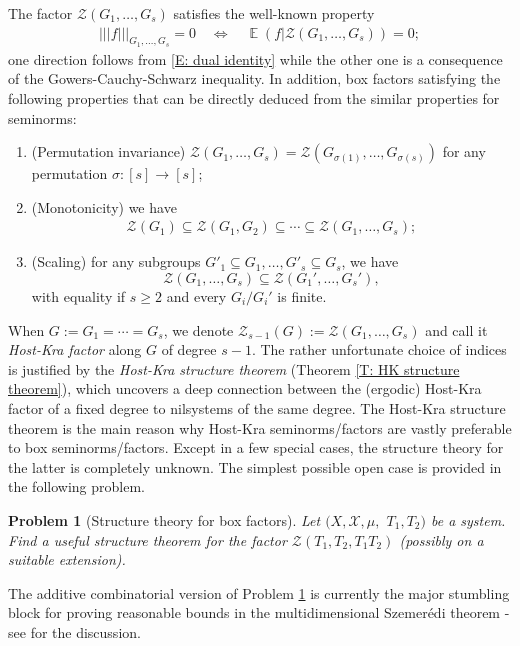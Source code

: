 \documentclass[11pt]{amsart}
\newtheorem{problem}{Problem}
\theoremstyle{definition}
\DeclareMathOperator*{\E}{\mathbb{E}}
\newcommand{\CX}{{\mathcal X}}
\newcommand{\CZ}{{\mathcal Z}}
\newcommand{\bh}{{\mathbf{h}}}
\newcommand{\nnorm}[1]{\lvert\!|\!| #1|\!|\!\rvert}
\newcommand{\1}{{\mathbf{1}}}
\begin{document}
The factor $\CZ({G_1, \ldots, G_s})$ satisfies the well-known property
\begin{align}\label{E: factor property}
    \nnorm{f}_{G_1, \ldots, G_s} = 0 \quad \Longleftrightarrow\quad \E(f|\CZ(G_1, \ldots, G_s)) = 0;
\end{align}
one direction follows from \eqref{E: dual identity} while the other one is a consequence of the Gowers-Cauchy-Schwarz inequality. In addition, box factors satisfying the following properties that can be directly deduced from the similar properties for seminorms:
\begin{enumerate}
    \item (Permutation invariance) $\CZ(G_1, \ldots, G_s) = \CZ(G_{\sigma(1)},\ldots, G_{\sigma(s)})$ for
    any permutation $\sigma:[s]\to[s]$; 
    \item (Monotonicity) we have
    \begin{align}\label{E: monotonicity of factors}
    \CZ(G_1)\subseteq \CZ({G_1, G_2})\subseteq \cdots\subseteq    \CZ({G_1, \ldots, G_s});
    \end{align}
    \item  (Scaling) for any subgroups $G'_1\subseteq G_1, \ldots, G'_s\subseteq G_s$, we have $$\CZ(G_1, \ldots, G_s)\subseteq \CZ(G_1', \ldots, G_s'),$$ with equality if $s\geq 2$ and every $G_i/G_i'$ is finite.
\end{enumerate}

When $G:=G_1 = \cdots = G_s$, we denote $\CZ_{s-1}(G) := \CZ(G_1, \ldots, G_s)$ and call it \emph{Host-Kra factor} along $G$ of degree $s-1$. The rather unfortunate choice of indices is justified by the \emph{Host-Kra structure theorem} (Theorem \ref{T: HK structure theorem}), which uncovers a deep connection between the (ergodic) Host-Kra factor of a fixed degree to nilsystems of the same degree. The Host-Kra structure theorem is the main reason why Host-Kra seminorms/factors are vastly preferable to box seminorms/factors. Except in a few special cases, the structure theory for the latter is completely unknown. The simplest possible open case is provided in the following problem.
\begin{problem}[Structure theory for box factors]\label{Pr: structure theorem for box}
    Let $(X, \CX, \mu,$\! $T_1, T_2)$ be a system. Find a useful structure theorem for the factor $\CZ(T_1, T_2, T_1T_2)$ (possibly on a suitable extension).
\end{problem}
The additive combinatorial version of Problem \ref{Pr: structure theorem for box} is currently the major stumbling block for proving reasonable bounds in the multidimensional Szemer\'edi theorem - see \cite[Section 4.2]{Pel24} for the discussion.
\end{document}
